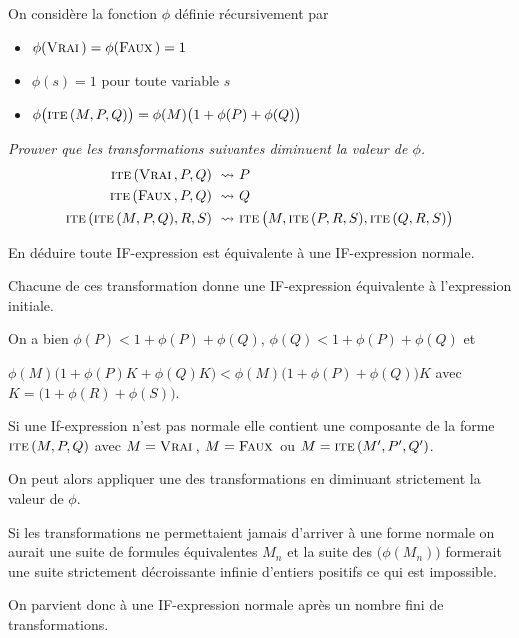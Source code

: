 \medskip

On considère la fonction $\phi$ définie récursivement par
\begin{itemize}
  \item $\phi(\text{\sc Vrai}\,)=\phi(\text{\sc Faux}\,)=1$
  \item $\phi(s)=1$ pour toute variable $s$
  \item $\phi\bigl(\text{\sc ite}\,(M,P,Q)\bigr)=\phi(M)\bigl(1+\phi(P)+\phi(Q)\bigr) $
\end{itemize}
\begin{Exercise}\it Prouver que les transformations suivantes diminuent la valeur de $\phi$.
\begin{align*}
  \text{\sc ite}\,(\text{\sc Vrai}\,,P,Q)\ \rightsquigarrow\  & P\\
  \text{\sc ite}\,(\text{\sc Faux}\,,P,Q)\ \rightsquigarrow\  & Q\\
  \text{\sc ite}\,(\text{\sc ite}\,(M,P,Q), R, S)\ \rightsquigarrow\  & \text{\sc ite}\,\bigl(M, \text{\sc ite}\,(P, R, S), \text{\sc ite}\,(Q, R, S)\bigr)
\end{align*}

En déduire toute IF-expression est équivalente à une IF-expression normale. 
\end{Exercise}
\begin{Answer} Chacune de ces transformation donne une IF-expression équivalente à l'expression initiale.

On a bien $\phi(P) < 1 + \phi(P)+\phi(Q)$, $\phi(Q) < 1 + \phi(P)+\phi(Q)$ et 

$\phi(M)\bigl(1+\phi(P)K + \phi(Q)K\bigr)<  \phi(M)\bigl(1+\phi(P) + \phi(Q)\bigr)K$ avec $K=\bigl(1+\phi(R)+\phi(S)\bigr)$.

Si une If-expression n'est pas normale elle contient une composante de la forme $\text{\sc ite}\,(M,P,Q)$ avec $M=\text{\sc Vrai}\,$, $M=\text{\sc Faux}\,$ ou $M=\text{\sc ite}\,(M',P',Q')$.

On peut alors appliquer une des transformations en diminuant strictement la valeur de $\phi$.

Si les transformations ne permettaient jamais d'arriver à une forme normale on aurait une suite de formules équivalentes $M_n$ et la suite des $\bigl(\phi(M_n)\bigr)$ formerait une suite strictement décroissante infinie d'entiers positifs ce qui est impossible.

On parvient donc à une IF-expression normale après un nombre fini de transformations.
\end{Answer}
